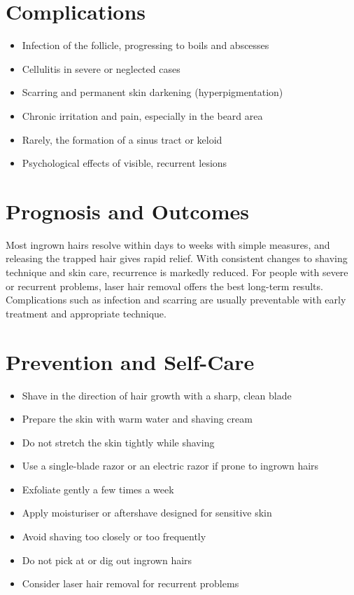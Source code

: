 \section*{Complications}
\begin{itemize}
    \item Infection of the follicle, progressing to boils and abscesses
    \item Cellulitis in severe or neglected cases
    \item Scarring and permanent skin darkening (hyperpigmentation)
    \item Chronic irritation and pain, especially in the beard area
    \item Rarely, the formation of a sinus tract or keloid
    \item Psychological effects of visible, recurrent lesions
\end{itemize}

\section*{Prognosis and Outcomes}
Most ingrown hairs resolve within days to weeks with simple measures, and releasing the trapped hair gives rapid relief. With consistent changes to shaving technique and skin care, recurrence is markedly reduced. For people with severe or recurrent problems, laser hair removal offers the best long-term results. Complications such as infection and scarring are usually preventable with early treatment and appropriate technique.

\section*{Prevention and Self-Care}
\begin{itemize}
    \item Shave in the direction of hair growth with a sharp, clean blade
    \item Prepare the skin with warm water and shaving cream
    \item Do not stretch the skin tightly while shaving
    \item Use a single-blade razor or an electric razor if prone to ingrown hairs
    \item Exfoliate gently a few times a week
    \item Apply moisturiser or aftershave designed for sensitive skin
    \item Avoid shaving too closely or too frequently
    \item Do not pick at or dig out ingrown hairs
    \item Consider laser hair removal for recurrent problems
\end{itemize}

